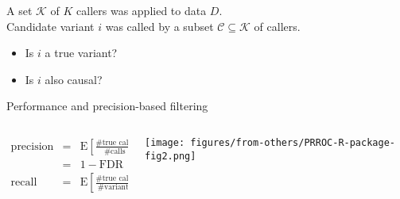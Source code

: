 \documentclass{beamer} %
\begin{document}
\begin{frame}{}

A set \(\mathcal{K}\) of \(K\) callers was applied to data \(D\).\\
Candidate variant \(i\) was called by a subset \(\mathcal{C}\subseteq\mathcal{K}\)
of callers.

\begin{itemize}
\item Is \(i\) a true variant?
\item Is \(i\) also causal?
\end{itemize}

\bigskip

\end{frame}

\begin{frame}{Performance and precision-based filtering}
\begin{columns}[t]
\small
\begin{column}{0.45\textwidth}
\begin{eqnarray*}
\text{precision} &=& \text{E} \left[ \frac{\text{\# true calls}}{\text{\# calls}} \right] \\
&=& 1 - \text{FDR} \\
\text{recall} &=& \text{E} \left[ \frac{\text{\# true calls}}{\text{\# variants}} \right]
\end{eqnarray*}
\end{column}
\begin{column}{0.6\textwidth}

\texttt{[image: figures/from-others/PRROC-R-package-fig2.png]}
\end{column}
\end{columns}

\end{frame}
\end{document}

